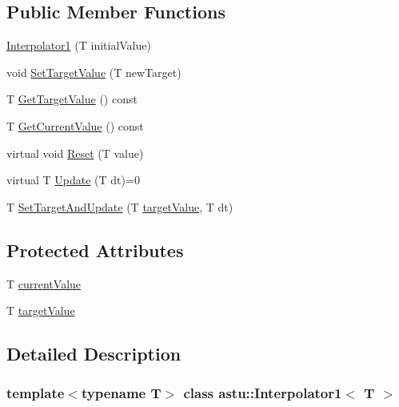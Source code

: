 \subsection*{Public Member Functions}
\begin{DoxyCompactItemize}
\item 
\hyperlink{classastu_1_1Interpolator1_af077a8b4048006a60119677e08a0434f}{Interpolator1} (T initial\+Value)
\item 
void \hyperlink{classastu_1_1Interpolator1_a6fb6493a2c2b0dc3352ab1b515c0d114}{Set\+Target\+Value} (T new\+Target)
\item 
T \hyperlink{classastu_1_1Interpolator1_ad5d42155623ede0a32350444f401903a}{Get\+Target\+Value} () const
\item 
T \hyperlink{classastu_1_1Interpolator1_a82c6c0471a52339263d9584fe19fe112}{Get\+Current\+Value} () const
\item 
virtual void \hyperlink{classastu_1_1Interpolator1_ae74b46754efa0cb8a2c768b1b3a66881}{Reset} (T value)
\item 
virtual T \hyperlink{classastu_1_1Interpolator1_a3507ba0a1fcb2f38539793f1906d8000}{Update} (T dt)=0
\item 
T \hyperlink{classastu_1_1Interpolator1_ac4d4223cbcbe72fba1a8e6d1ae34edfd}{Set\+Target\+And\+Update} (T \hyperlink{classastu_1_1Interpolator1_a2809c5cc739cc96d3adb6d852fc54a15}{target\+Value}, T dt)
\end{DoxyCompactItemize}
\subsection*{Protected Attributes}
\begin{DoxyCompactItemize}
\item 
T \hyperlink{classastu_1_1Interpolator1_a31df825a086aed6ad861c308e6061513}{current\+Value}
\item 
T \hyperlink{classastu_1_1Interpolator1_a2809c5cc739cc96d3adb6d852fc54a15}{target\+Value}
\end{DoxyCompactItemize}


\subsection{Detailed Description}
\subsubsection*{template$<$typename T$>$\newline
class astu\+::\+Interpolator1$<$ T $>$}

